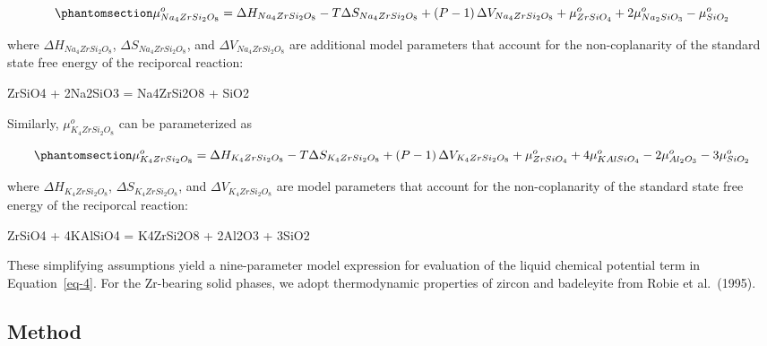 \documentclass[
]{agujournal2019}
\begin{document}
\begin{equation}\phantomsection\label{eq-6}{
\mu_{Na_4ZrSi_2O_8}^{o} = \Delta H_{Na_4ZrSi_2O_8} - T \Delta S_{Na_4ZrSi_2O_8} + \left( P - 1 \right) \Delta V_{Na_4ZrSi_2O_8} + \mu_{ZrSiO_4}^{o} + 2 \mu_{Na_2SiO_3}^{o} - \mu_{SiO_2}^{o}
}\end{equation}

where \(\Delta H_{Na_4ZrSi_2O_8}\), \(\Delta S_{Na_4ZrSi_2O_8}\), and
\(\Delta V_{Na_4ZrSi_2O_8}\) are additional model parameters that
account for the non-coplanarity of the standard state free energy of the
reciporcal reaction:

ZrSiO4 + 2Na2SiO3 = Na4ZrSi2O8 + SiO2

Similarly, \(\mu_{K_4ZrSi_2O_8}^{o}\) can be parameterized as

\begin{equation}\phantomsection\label{eq-7}{
\mu_{K_4ZrSi_2O_8}^{o} = \Delta H_{K_4ZrSi_2O_8} - T \Delta S_{K_4ZrSi_2O_8} + \left( P - 1 \right) \Delta V_{K_4ZrSi_2O_8} + \mu_{ZrSiO_4}^{o} + 4 \mu_{KAlSiO_4}^{o} - 2 \mu_{Al_2O_3}^{o} - 3 \mu_{SiO_2}^{o}
}\end{equation}

where \(\Delta H_{K_4ZrSi_2O_8}\), \(\Delta S_{K_4ZrSi_2O_8}\), and
\(\Delta V_{K_4ZrSi_2O_8}\) are model parameters that account for the
non-coplanarity of the standard state free energy of the reciporcal
reaction:

ZrSiO4 + 4KAlSiO4 = K4ZrSi2O8 + 2Al2O3 + 3SiO2

These simplifying assumptions yield a nine-parameter model expression
for evaluation of the liquid chemical potential term in
Equation~\ref{eq-4}. For the Zr-bearing solid phases, we adopt
thermodynamic properties of zircon and badeleyite from Robie et
al.~(1995).

\subsection{Method}\label{method}
\end{document}
